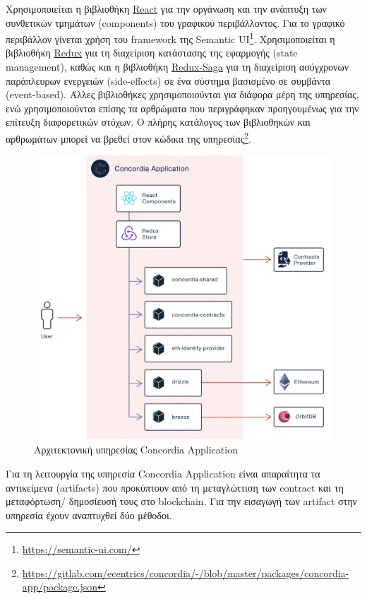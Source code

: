 Χρησιμοποιείται η βιβλιοθήκη \hyperref[subsection:4-2-2-1-react]{React} για την οργάνωση και την ανάπτυξη των συνθετικών τμημάτων (components) του γραφικού περιβάλλοντος. Για το γραφικό περιβάλλον γίνεται χρήση του framework της Semantic UI\footnote{\url{https://semantic-ui.com/}}. Χρησιμοποιείται η βιβλιοθήκη \hyperref[subsection:4-2-2-2-redux]{Redux} για τη διαχείριση κατάστασης της εφαρμογής (state management),
καθώς και η βιβλιοθήκη \hyperref[subsection:4-2-2-3-redux-saga]{Redux-Saga} για τη διαχείριση ασύγχρονων παράπλευρων ενεργειών (side-effects) σε ένα σύστημα βασισμένο σε συμβάντα (event-based). Άλλες βιβλιοθήκες χρησιμοποιούνται για διάφορα μέρη της υπηρεσίας, ενώ χρησιμοποιούνται επίσης τα αρθρώματα που περιγράφηκαν προηγουμένως για την επίτευξη διαφορετικών στόχων. Ο πλήρης κατάλογος των βιβλιοθηκών και αρθρωμάτων μπορεί να βρεθεί στον κώδικα της υπηρεσίας\footnote{\url{https://gitlab.com/ecentrics/concordia/-/blob/master/packages/concordia-app/package.json}}.

\vspace{\baselineskip}

\begin{figure}[H]
    \centering
    \includegraphics[width=.9\textwidth]{assets/figures/chapter-4/4.3.architecture-4.3.2.concordia-application-architecture.png}
    \caption{Αρχιτεκτονική υπηρεσίας Concordia Application}
    \label{figure:4-3-concordia-application-architecture}
\end{figure}

Για τη λειτουργία της υπηρεσία Concordia Application είναι απαραίτητα τα αντικείμενα (artifacts) που προκύπτουν από τη μεταγλώττιση των contract και τη μεταφόρτωση/ δημοσίευσή τους στο blockchain. Για την εισαγωγή των artifact στην υπηρεσία έχουν αναπτυχθεί δύο μέθοδοι.

